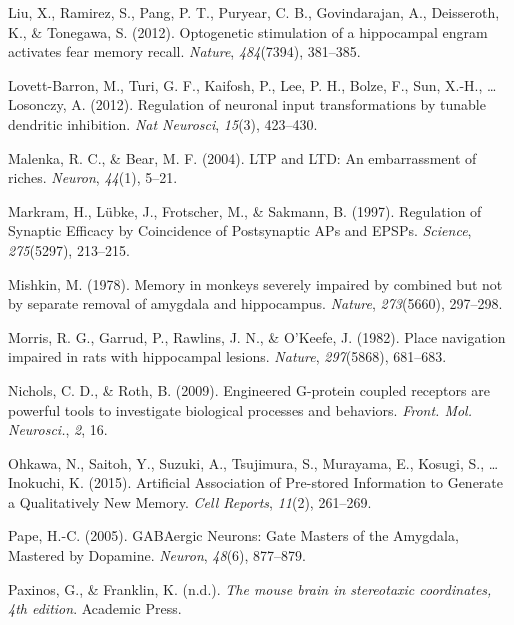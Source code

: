 \documentclass[12pt,a4paperpaper,]{report}
\begin{document}
\hypertarget{ref-liuux5foptogeneticux5f2012}{}
Liu, X., Ramirez, S., Pang, P. T., Puryear, C. B., Govindarajan, A.,
Deisseroth, K., \& Tonegawa, S. (2012). Optogenetic stimulation of a
hippocampal engram activates fear memory recall. \emph{Nature},
\emph{484}(7394), 381--385.

\hypertarget{ref-lovett-barronux5fregulationux5f2012}{}
Lovett-Barron, M., Turi, G. F., Kaifosh, P., Lee, P. H., Bolze, F., Sun,
X.-H., \ldots{} Losonczy, A. (2012). Regulation of neuronal input
transformations by tunable dendritic inhibition. \emph{Nat Neurosci},
\emph{15}(3), 423--430.

\hypertarget{ref-malenkaux5fltpux5f2004}{}
Malenka, R. C., \& Bear, M. F. (2004). LTP and LTD: An embarrassment of
riches. \emph{Neuron}, \emph{44}(1), 5--21.

\hypertarget{ref-markramux5fregulationux5f1997}{}
Markram, H., Lübke, J., Frotscher, M., \& Sakmann, B. (1997). Regulation
of Synaptic Efficacy by Coincidence of Postsynaptic APs and EPSPs.
\emph{Science}, \emph{275}(5297), 213--215.

\hypertarget{ref-mishkinux5fmemoryux5f1978}{}
Mishkin, M. (1978). Memory in monkeys severely impaired by combined but
not by separate removal of amygdala and hippocampus. \emph{Nature},
\emph{273}(5660), 297--298.

\hypertarget{ref-morrisux5fplaceux5f1982-1}{}
Morris, R. G., Garrud, P., Rawlins, J. N., \& O'Keefe, J. (1982). Place
navigation impaired in rats with hippocampal lesions. \emph{Nature},
\emph{297}(5868), 681--683.

\hypertarget{ref-nicholsux5fengineeredux5f2009}{}
Nichols, C. D., \& Roth, B. (2009). Engineered G-protein coupled
receptors are powerful tools to investigate biological processes and
behaviors. \emph{Front. Mol. Neurosci.}, \emph{2}, 16.

\hypertarget{ref-ohkawaux5fartificialux5f2015}{}
Ohkawa, N., Saitoh, Y., Suzuki, A., Tsujimura, S., Murayama, E., Kosugi,
S., \ldots{} Inokuchi, K. (2015). Artificial Association of Pre-stored
Information to Generate a Qualitatively New Memory. \emph{Cell Reports},
\emph{11}(2), 261--269.

\hypertarget{ref-papeux5fgabaergicux5f2005}{}
Pape, H.-C. (2005). GABAergic Neurons: Gate Masters of the Amygdala,
Mastered by Dopamine. \emph{Neuron}, \emph{48}(6), 877--879.

\hypertarget{ref-paxinosux5fmouseux5f2010}{}
Paxinos, G., \& Franklin, K. (n.d.). \emph{The mouse brain in
stereotaxic coordinates, 4th edition}. Academic Press.
\end{document}
